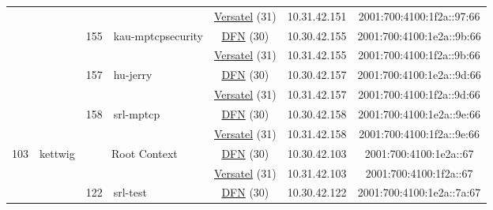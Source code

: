 \begin{small}
\begin{center}
\begin{longtable}{|c|c|c|c|c|c|c|c|}
  &  &  &  & \multicolumn{2}{|c|}{\tiny{\href{http://www.versatel.de}{Versatel} (31)}} & \tiny{10.31.42.151} & \tiny{2001:700:4100:1f2a::97:66} \\* \cline{3-3}\cline{4-4}\cline{5-5}\cline{6-6}\cline{7-7}\cline{8-8}
  &  & \multirow{2}{*}{\tiny{155}} & \multicolumn{1}{|l|}{\multirow{2}{*}{\tiny{kau-mptcpsecurity}}} & \multicolumn{2}{|c|}{\tiny{\href{https://www.dfn.de}{DFN} (30)}} & \tiny{10.30.42.155} & \tiny{2001:700:4100:1e2a::9b:66} \\* \cline{5-5}\cline{6-6}\cline{7-7}\cline{8-8}
  &  &  &  & \multicolumn{2}{|c|}{\tiny{\href{http://www.versatel.de}{Versatel} (31)}} & \tiny{10.31.42.155} & \tiny{2001:700:4100:1f2a::9b:66} \\* \cline{3-3}\cline{4-4}\cline{5-5}\cline{6-6}\cline{7-7}\cline{8-8}
  &  & \multirow{2}{*}{\tiny{157}} & \multicolumn{1}{|l|}{\multirow{2}{*}{\tiny{hu-jerry}}} & \multicolumn{2}{|c|}{\tiny{\href{https://www.dfn.de}{DFN} (30)}} & \tiny{10.30.42.157} & \tiny{2001:700:4100:1e2a::9d:66} \\* \cline{5-5}\cline{6-6}\cline{7-7}\cline{8-8}
  &  &  &  & \multicolumn{2}{|c|}{\tiny{\href{http://www.versatel.de}{Versatel} (31)}} & \tiny{10.31.42.157} & \tiny{2001:700:4100:1f2a::9d:66} \\* \cline{3-3}\cline{4-4}\cline{5-5}\cline{6-6}\cline{7-7}\cline{8-8}
  &  & \multirow{2}{*}{\tiny{158}} & \multicolumn{1}{|l|}{\multirow{2}{*}{\tiny{srl-mptcp}}} & \multicolumn{2}{|c|}{\tiny{\href{https://www.dfn.de}{DFN} (30)}} & \tiny{10.30.42.158} & \tiny{2001:700:4100:1e2a::9e:66} \\* \cline{5-5}\cline{6-6}\cline{7-7}\cline{8-8}
  &  &  &  & \multicolumn{2}{|c|}{\tiny{\href{http://www.versatel.de}{Versatel} (31)}} & \tiny{10.31.42.158} & \tiny{2001:700:4100:1f2a::9e:66} \\ \hline
 \multirow{20}{*}{\tiny{103}} & \multicolumn{1}{|l|}{\multirow{20}{*}{\tiny{kettwig}}} & \multicolumn{2}{|c|}{\multirow{2}{*}{\tiny{Root Context}}} & \multicolumn{2}{|c|}{\tiny{\href{https://www.dfn.de}{DFN} (30)}} & \tiny{10.30.42.103} & \tiny{2001:700:4100:1e2a::67} \\* \cline{5-5}\cline{6-6}\cline{7-7}\cline{8-8}
  &  & \multicolumn{2}{|c|}{} & \multicolumn{2}{|c|}{\tiny{\href{http://www.versatel.de}{Versatel} (31)}} & \tiny{10.31.42.103} & \tiny{2001:700:4100:1f2a::67} \\* \cline{3-3}\cline{4-4}\cline{5-5}\cline{6-6}\cline{7-7}\cline{8-8}
  &  & \multirow{2}{*}{\tiny{122}} & \multicolumn{1}{|l|}{\multirow{2}{*}{\tiny{srl-test}}} & \multicolumn{2}{|c|}{\tiny{\href{https://www.dfn.de}{DFN} (30)}} & \tiny{10.30.42.122} & \tiny{2001:700:4100:1e2a::7a:67} \\* \cline{5-5}\cline{6-6}\cline{7-7}\cline{8-8}

\end{longtable}
\end{center}
\end{small}
